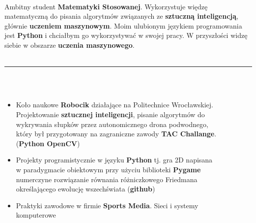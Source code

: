 \documentclass[10pt]{article}
\begin{document}
    \begin{minipage}[t]{0.60\textwidth}
        \fontsize{10pt}{10pt}
        \\


        Ambitny student \textbf{Matematyki Stosowanej}. Wykorzystuje więdzę matematyczną 
        do pisania algorytmów związanych ze \textbf{sztuczną inteligencją}, 
        głównie \textbf{uczeniem maszynowym}. Moim ulubionym językiem
        programowania jest \textbf{Python} i chciałbym go wykorzystywać w swojej pracy.
        W przyszłości widzę siebie w obszarze \textbf{uczenia maszynowego}. \\ \\
        \rule{11cm}{1pt} \\ \\
        \fontsize{10pt}{10pt}
        \begin{itemize}[leftmargin=*]
            \setlength{\parskip}{0pt}
            \item Koło naukowe \textbf{Robocik} działające na Politechnice Wrocławskiej. \\
            Projektowanie \textbf{sztucznej inteligencji}, pisanie algorytmów do \\
            wykrywania słupków przez autonomicznego drona podwodnego, \\
            który był przygotowany na zagraniczne zawody \textbf{TAC Challange}. \\
            (\textbf{Python OpenCV})
            \item Projekty programistycznie w języku \textbf{Python} tj. gra 2D napisana \\
            w paradygmacie obiektowym przy użyciu biblioteki \textbf{Pygame} \\
            numerczyne rozwiązanie równania różniczkowego Friedmana \\
            określającego ewolucję wszechświata  (\textbf{github})
            \item Praktyki zawodowe w firmie \textbf{Sports Media}. Sieci i systemy \\ komputerowe

\end{itemize}
\end{minipage}
\end{document}
